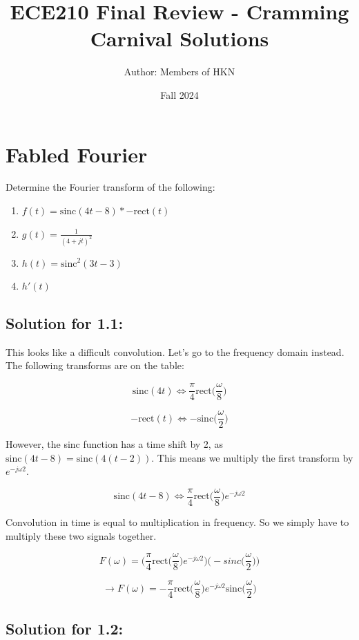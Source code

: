 \documentclass{article}
\title{ECE210 Final Review - Cramming Carnival Solutions}
\author{Author: Members of HKN}
\date{Fall 2024}
\begin{document}
\maketitle


\section{Fabled Fourier}

Determine the Fourier transform of the following:
\begin{enumerate}
    \item $f(t) = \text{sinc}(4t-8) * -\text{rect}(t)$
    \item $g(t) = \frac{1}{(4 + jt)^2}$
    \item $h(t) = \text{sinc}^2(3t-3)$
    \item $h'(t)$
\end{enumerate}

\subsection{Solution for 1.1:}

This looks like a difficult convolution. Let's go to the frequency domain instead. The following transforms are on the table:

$$\text{sinc}(4t) \Longleftrightarrow \frac{\pi}{4} \text{rect}\bigg(\frac{\omega}{8}\bigg)$$

$$-\text{rect}(t) \Longleftrightarrow -\text{sinc}\bigg(\frac{\omega}{2}\bigg)$$

However, the sinc function has a time shift by 2, as $\text{sinc}(4t-8) = \text{sinc}(4(t-2))$. This means we multiply the first transform by $e^{-j\omega2}$.

$$\text{sinc}(4t-8) \Longleftrightarrow \frac{\pi}{4} \text{rect}\bigg(\frac{\omega}{8}\bigg)e^{-j\omega2}$$

Convolution in time is equal to multiplication in frequency. So we simply have to multiply these two signals together.

$$F(\omega) = \bigg(\frac{\pi}{4} \text{rect}\bigg(\frac{\omega}{8}\bigg)e^{-j\omega2}\bigg)\bigg(-sinc\bigg(\frac{\omega}{2}\bigg)\bigg)$$

$$\longrightarrow \boxed{F(\omega) = -\frac{\pi}{4} \text{rect}\bigg(\frac{\omega}{8}\bigg)e^{-j\omega2}\text{sinc}\bigg(\frac{\omega}{2}\bigg)}$$

\subsection{Solution for 1.2:}
\end{document}
